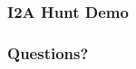 \begin{frame}
    \frametitle{I2A Hunt Demo}
    
\end{frame}
\clearpage


\begin{frame}
    \frametitle{Questions?}
    
\end{frame}
\clearpage



